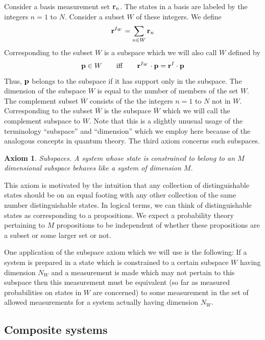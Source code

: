 \documentclass[12pt]{article}
\newtheorem{axiom}{Axiom}
\begin{document}
Consider a basis measurement set ${\bf r}_n$. The states in a basis are
labeled by the integers $n=1$ to $N$. Consider a subset $W$ of these
integers. We define
\begin{equation}
{\bf r}^{I_W}=\sum_{n\in W} {\bf r}_n
\end{equation}
Corresponding to the subset $W$ is a subspace which we will also call
$W$ defined by
\begin{equation}
{\bf p}\in W \qquad {\rm iff}\qquad
{\bf r}^{I_W}\cdot{\bf p}={\bf r}^{I}\cdot{\bf p}
\end{equation}
Thus, ${\bf p}$ belongs to the subspace if it has support only in the
subspace.  The dimension of the subspace $W$ is equal to the number of
members of the set $W$. The complement subset $\overline{W}$ consists of
the the integers $n=1$ to $N$ not in $W$.  Corresponding to the subset
$\overline{W}$ is the subspace $\overline{W}$ which we will call the
complement subspace to $W$.
Note that this is a slightly unusual usage of the
terminology ``subspace'' and ``dimension''
which we employ here because of the analogous concepts in quantum theory.
The third axiom concerns such subspaces.
\begin{axiom}
{\rm Subspaces}. A system whose state is constrained to belong to an $M$
dimensional subspace behaves like a system of dimension $M$.
\end{axiom}
This axiom is motivated by the intuition that any
collection of distinguishable states should be on an equal
footing with any other collection of the same number distinguishable
states.  In logical terms, we can think of distinguishable states as
corresponding to a propositions.  We expect a probability theory
pertaining to $M$ propositions to be independent of whether these
propositions are a subset or some larger set or not.

One application of the subspace axiom which we will use is the
following: If a system is prepared in a state which is constrained to a
certain subspace $W$ having dimension $N_W$ and a measurement is made
which may not pertain to
this subspace then this measurement must be equivalent (so far as
measured probabilities on states in $W$ are concerned) to some
measurement in the set of allowed measurements for a system actually
having dimension $N_W$.

\subsection{Composite systems}\label{compositesystems}
\end{document}
